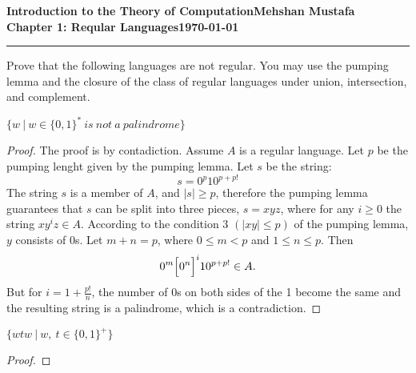 \documentclass[11pt]{article}
\newcommand{\myname}{Mehshan Mustafa}
\newcommand{\dated}{\today}
\newenvironment{problem}[2][Problem]{\begin{trivlist}
\item[\hskip \labelsep {\bfseries #1}\hskip \labelsep {\bfseries #2.}]}{\end{trivlist}}
\begin{document}
\textbf{Introduction to the Theory of
Computation}\hfill\textbf{\myname}\\[0.01in]
\textbf{Chapter 1: Reqular Languages}\hfill\textbf{\dated}\\
\smallskip\hrule\bigskip

\begin{problem}{1.46}
Prove that the following languages are not regular. You may use the pumping
lemma and the closure of the class of regular languages under union, intersection, and complement.
\end{problem}

\begin{problem}[Part]{c}
$\{w \ | \ w \in \{0,1\}^{*} \ is \ not \ a \ palindrome\}$
\end{problem}

\begin{proof}
The proof is by contadiction. Assume $A$ is a regular language. Let $p$ be the pumping lenght given by the pumping lemma. Let $s$ be the string:
\[ s = 0^{p}10^{p+p!} \]
The string $s$ is a member of $A$, and $|s| \geq p$, therefore the pumping lemma guarantees that $s$ can be split into three pieces, $s = xyz$, where for any $i \geq 0$ the string $xy^{i}z \in A$. According to the condition 3 $(|xy| \leq p)$ of the pumping lemma, $y$ consists of 0s. Let $m+n = p$, where $0 \leq m < p$ and $1 \leq n \leq p$. Then
\[ 0^{m} \Bigl[0^{n}\Bigr]^{i}10^{p+p!} \in A. \]
But for $i = 1 + \frac{p!}{n}$, the number of 0s on both sides of the 1 become the same and the resulting string is a palindrome, which is a contradiction.
\end{proof}

\begin{problem}[Part]{d}
$\{wtw \ | \ w, \ t \in \{0,1\}^{+}\}$
\end{problem}

\begin{proof}
\end{proof}
\end{document}
